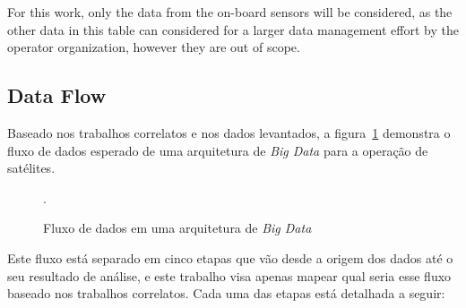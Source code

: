 For this work, only the data from the on-board sensors will be considered, as the other data in this table can considered for a larger data management effort by the operator organization, however they are out of scope.

\subsection{Data Flow}\label{ch:corr:dataflow}

Baseado nos trabalhos correlatos e nos dados levantados, a figura~\ref{fig:bigdataflow} demonstra o fluxo de dados esperado de uma arquitetura de \textit{Big Data} para a operação de satélites.

\begin{figure}[ht]
	\caption{Fluxo de dados em uma arquitetura de \textit{Big Data}}\label{fig:bigdataflow}
	\vspace{6mm}
	\begin{center}
	\end{center}
	\vspace{2mm}
	\legenda{}
	.
\end{figure}

Este fluxo está separado em cinco etapas que vão desde a origem dos dados até o seu resultado de análise, e este trabalho visa apenas mapear qual seria esse fluxo baseado nos trabalhos correlatos.
Cada uma das etapas está detalhada a seguir:

